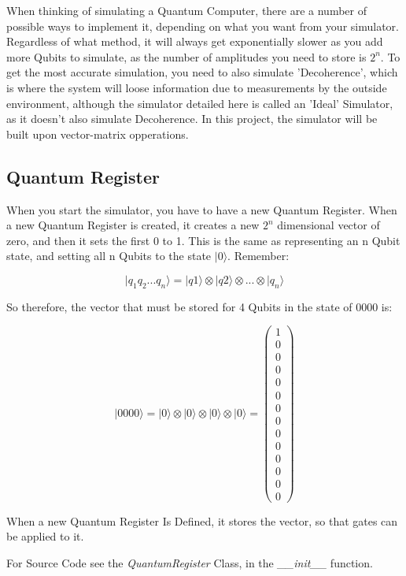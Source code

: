 \documentclass[../main.tex]{subfiles}
\begin{document}
When thinking of simulating a Quantum Computer, there are a number of possible ways to implement it, depending on what you want from your simulator.
Regardless of what method, it will always get exponentially slower as you add more Qubits to simulate, as the number of amplitudes you need to store is \(2^n\). 
To get the most accurate simulation, you need to also simulate 'Decoherence', which is where the system will loose information due to measurements by the outside environment, although the simulator detailed here is called an 'Ideal' Simulator, as it doesn't also simulate Decoherence.
In this project, the simulator will be built upon vector-matrix opperations.

\subsection{Quantum Register}
When you start the simulator, you have to have a new Quantum Register. When a new Quantum Register is created, it creates a new \(2^n\) dimensional vector of zero, and then it sets the first 0 to 1. This is the same as representing an n Qubit state, and setting all n Qubits to the state \(\lvert0\rangle\). Remember:

$$
\lvert q_1 q_2...q_n \rangle = \lvert q1 \rangle \otimes \lvert q2 \rangle \otimes ... \otimes \lvert q_n \rangle
$$

So therefore, the vector that must be stored for 4 Qubits in the state of 0000 is:

$$
\lvert0000\rangle = \lvert0\rangle \otimes \lvert0\rangle \otimes \lvert0\rangle \otimes \lvert0\rangle = \left( \begin{matrix} 1 \\ 0 \\ 0 \\ 0 \\ 0 \\ 0 \\ 0 \\ 0 \\ 0 \\ 0 \\ 0 \\ 0 \\ 0 \\ 0 \end{matrix} \right)
$$

When a new Quantum Register Is Defined, it stores the vector, so that gates can be applied to it.

For Source Code see the \emph{QuantumRegister} Class, in the \emph{\_\_init\_\_} function.
\end{document}
